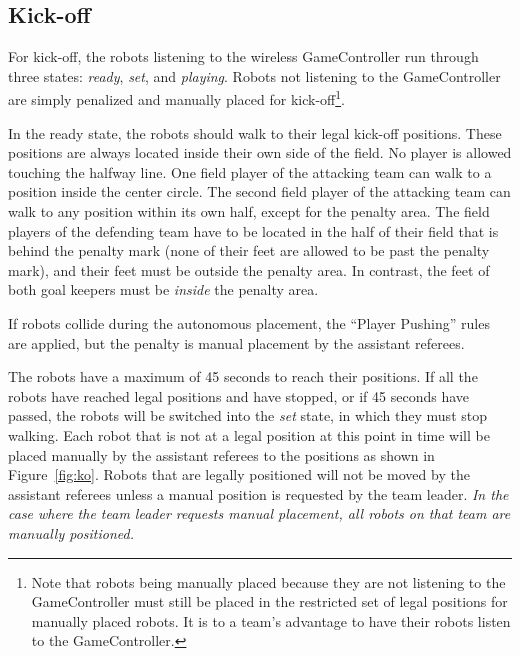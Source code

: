 \documentclass[12pt]{article}
\newcommand{\KickOffAutoTime}{45 seconds\xspace}
\begin{document}
\subsection{Kick-off}
\label{sec:kick-off}

For kick-off, the robots listening to the wireless GameController run through three states: \emph{ready}, \emph{set}, and \emph{playing}. Robots not listening to the GameController are simply penalized and manually placed for kick-off\footnote{Note that robots being manually placed because they are not listening to the GameController must still be placed in the restricted set of legal positions for manually placed robots. It is to a team's advantage to have their robots listen to the GameController.}.

In the ready state, the robots should walk to their legal kick-off positions. These positions are always located inside their own side of the field. No player is allowed touching the halfway line. One field player of the attacking team can walk to a position inside the center circle. The second field player of the attacking team can walk to any position within its own half, except for the penalty area. The field players of the defending team have to be located in the half of their field that is behind the penalty mark (none of their feet are allowed to be past the penalty mark), and their feet must be outside the penalty area. In contrast, the feet of both goal keepers must be \emph{inside} the penalty area.

If robots collide during the autonomous placement, the ``Player Pushing'' rules are applied, but the penalty is manual placement by the assistant referees.

The robots have a maximum of \KickOffAutoTime to reach their positions. If all the robots have reached legal positions and have stopped, or if \KickOffAutoTime have passed, the robots will be switched into the \emph{set} state, in which they must stop walking. Each robot that is not at a legal position at this point in time will be placed manually by the assistant referees to the positions as shown in Figure~\ref{fig:ko}. Robots that are legally positioned will not be moved by the assistant referees unless a manual position is requested by the team leader.
\emph{In the case where the team leader requests manual placement, all robots on that team are manually positioned.}
\end{document}

